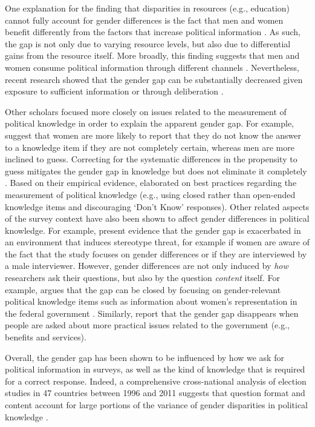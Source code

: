 \documentclass[12pt]{article}
\begin{document}
One explanation for the finding that disparities in resources (e.g., education) cannot fully account for gender differences is the fact that men and women benefit differently from the factors that increase political information \citep{dow2009gender}. As such, the gap is not only due to varying resource levels, but also due to differential gains from the resource itself. More broadly, this finding suggests that men and women consume political information through different channels \citep[see also][]{pietryka2013analysis}. Nevertheless, recent research showed that the gender gap can be substantially decreased given exposure to sufficient information \citep[e.g.][]{jerit2017revisiting} or through deliberation \citep{fraile2014does}.

Other scholars focused more closely on issues related to the measurement of political knowledge in order to explain the apparent gender gap. For example, \citet{mondak2004knowledge} suggest that women are more likely to report that they do not know the answer to a knowledge item if they are not completely certain, whereas men are more inclined to guess. Correcting for the systematic differences in the propensity to guess mitigates the gender gap in knowledge but does not eliminate it completely \citep[see also][]{lizotte2009explaining}. Based on their empirical evidence, \citet{mondak2004knowledge} elaborated on best practices regarding the measurement of political knowledge (e.g., using closed rather than open-ended knowledge items and discouraging `Don't Know' responses). Other related aspects of the survey context have also been shown to affect gender differences in political knowledge. For example, \citet{mcglone2006stereotype} present evidence that the gender gap is exacerbated in an environment that induces stereotype threat, for example if women are aware of the fact that the study focuses on gender differences or if they are interviewed by a male interviewer. However, gender differences are not only induced by \textit{how} researchers ask their questions, but also by the question \textit{content} itself. For example, \citet{dolan2011women} argues that the gap can be closed by focusing on gender-relevant political knowledge items such as information about women's representation in the federal government \citep[see also][]{graber2001processing}. Similarly, \citet{stolle2010women} report that the gender gap disappears when people are asked about more practical issues related to the government (e.g., benefits and services).

Overall, the gender gap has been shown to be influenced by how we ask for political information in surveys, as well as the kind of knowledge that is required for a correct response. Indeed, a comprehensive cross-national analysis of election studies in 47 countries between 1996 and 2011 suggests that question format and content account for large portions of the variance of gender disparities in political knowledge \citep{fortin2016cross}.
\end{document}
